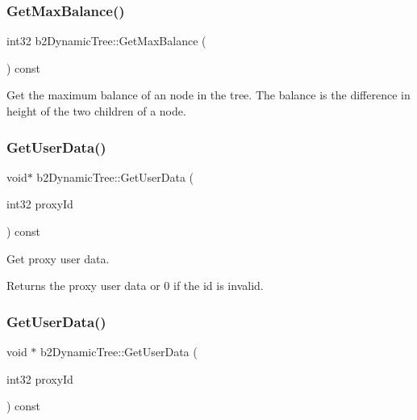 \subsubsection{\texorpdfstring{Get\+Max\+Balance()}{GetMaxBalance()}\hspace{0.1cm}{\footnotesize\ttfamily [2/2]}}
{\footnotesize\ttfamily int32 b2\+Dynamic\+Tree\+::\+Get\+Max\+Balance (\begin{DoxyParamCaption}{ }\end{DoxyParamCaption}) const}

Get the maximum balance of an node in the tree. The balance is the difference in height of the two children of a node. \mbox{\label{classb2DynamicTree_ac36ab1d116884966f279b8a8fb89ea19}} 
\subsubsection{\texorpdfstring{Get\+User\+Data()}{GetUserData()}\hspace{0.1cm}{\footnotesize\ttfamily [1/2]}}
{\footnotesize\ttfamily void$\ast$ b2\+Dynamic\+Tree\+::\+Get\+User\+Data (\begin{DoxyParamCaption}\item[{int32}]{proxy\+Id }\end{DoxyParamCaption}) const}

Get proxy user data. \begin{DoxyReturn}{Returns}
the proxy user data or 0 if the id is invalid. 
\end{DoxyReturn}
\mbox{\label{classb2DynamicTree_aa8399f9440707780f267696098e8b920}} 
\subsubsection{\texorpdfstring{Get\+User\+Data()}{GetUserData()}\hspace{0.1cm}{\footnotesize\ttfamily [2/2]}}
{\footnotesize\ttfamily void $\ast$ b2\+Dynamic\+Tree\+::\+Get\+User\+Data (\begin{DoxyParamCaption}\item[{int32}]{proxy\+Id }\end{DoxyParamCaption}) const\hspace{0.3cm}{\ttfamily [inline]}}

